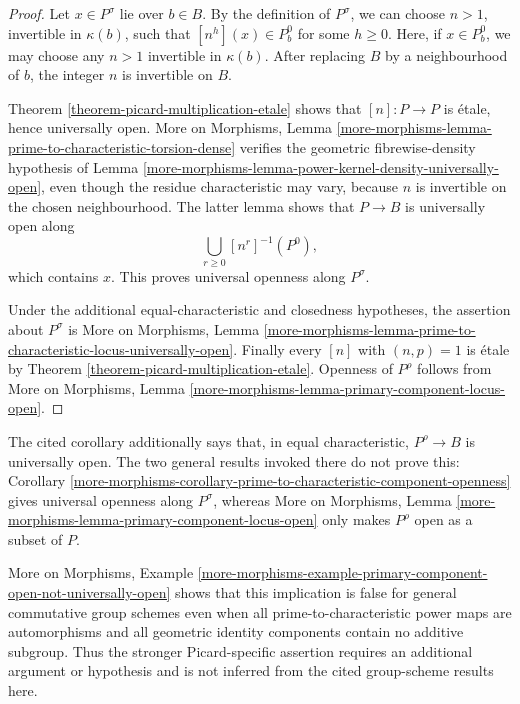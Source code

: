 \begin{proof}
Let $x\in P^\sigma$ lie over $b\in B$. By the definition of $P^\sigma$, we
can choose $n>1$, invertible in $\kappa(b)$, such that
$[n^h](x)\in P_b^0$ for some $h\geq 0$. Here, if $x\in P_b^0$, we may choose
any $n>1$ invertible in $\kappa(b)$. After replacing $B$ by a neighbourhood
of $b$, the integer $n$ is invertible on $B$.

Theorem \ref{theorem-picard-multiplication-etale} shows that
$[n]:P\to P$ is \'etale, hence universally open. More on Morphisms, Lemma
\ref{more-morphisms-lemma-prime-to-characteristic-torsion-dense} verifies the
geometric fibrewise-density hypothesis of Lemma
\ref{more-morphisms-lemma-power-kernel-density-universally-open}, even though
the residue characteristic may vary, because $n$ is invertible on the chosen
neighbourhood. The latter lemma shows that $P\to B$ is universally open along
$$
\bigcup_{r\geq 0}[n^r]^{-1}(P^0),
$$
which contains $x$. This proves universal openness along $P^\sigma$.

Under the additional equal-characteristic and closedness hypotheses, the
assertion about $P^\sigma$ is More on Morphisms, Lemma
\ref{more-morphisms-lemma-prime-to-characteristic-locus-universally-open}.
Finally every $[n]$ with $(n,p)=1$ is \'etale by Theorem
\ref{theorem-picard-multiplication-etale}. Openness of $P^\rho$ follows from
More on Morphisms, Lemma
\ref{more-morphisms-lemma-primary-component-locus-open}.
\end{proof}

\begin{remark}
\label{remark-picard-primary-component-openness-boundary}
The cited corollary additionally says that, in equal characteristic,
$P^\rho\to B$ is universally open. The two general results invoked there do
not prove this: Corollary
\ref{more-morphisms-corollary-prime-to-characteristic-component-openness}
gives universal openness along $P^\sigma$, whereas More on Morphisms, Lemma
\ref{more-morphisms-lemma-primary-component-locus-open} only makes $P^\rho$
open as a subset of $P$.

More on Morphisms, Example
\ref{more-morphisms-example-primary-component-open-not-universally-open}
shows that this implication is false for general commutative group schemes
even when all prime-to-characteristic power maps are automorphisms and all
geometric identity components contain no additive subgroup. Thus the stronger
Picard-specific assertion requires an additional argument or hypothesis and
is not inferred from the cited group-scheme results here.
\end{remark}

